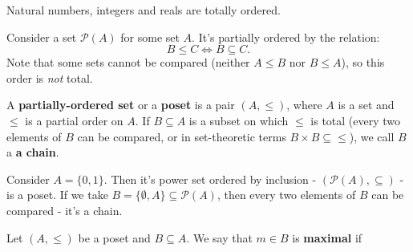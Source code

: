\begin{example}
  Natural numbers, integers and reals are totally ordered.
\end{example}

\begin{example}
  Consider a set $\mathcal P(A)$ for some set $A$. It's partially ordered by the relation:
  $$B\le C \Leftrightarrow B\subseteq C.$$
  Note that some sets cannot be compared (neither $A\le B$ nor $B\le A$), so this order is \textit{not} total.
\end{example}

\begin{definition}
  A \textbf{partially-ordered set} or a \textbf{poset} is a pair $(A, \le)$, where $A$ is a set and $\le$ is a partial order on $A$. If $B\subseteq A$ is a subset on which
  $\le$ is total (every two elements of $B$ can be compared, or in set-theoretic terms $B\times B\subseteq \le$), we call $B$ a \textbf{a chain}.
\end{definition}

\begin{example}
  Consider $A=\{0,1\}$. Then it's power set ordered by inclusion - $(\mathcal P(A), \subseteq)$ - is a poset. If we take $B=\{\emptyset,A\}\subseteq \mathcal P(A)$,
  then every two elements of $B$ can be compared - it's a chain.
\end{example}

\begin{definition}
  Let $(A, \le)$ be a poset and $B\subseteq A$. We say that $m\in B$ is \textbf{maximal} if 
\end{definition}

